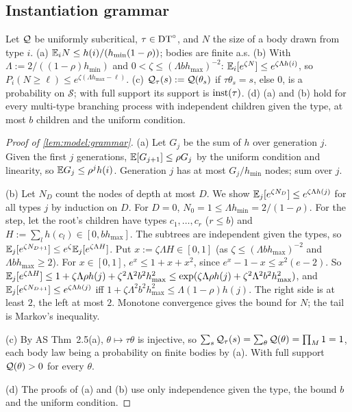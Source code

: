 \subsection{Instantiation grammar}\label{app:model:grammar}

\begin{lemma}\label{lem:model:grammar}
Let $\mathcal{Q}$ be uniformly subcritical, $\tau\in\mathrm{DT}^{\circ}$, and $N$ the size of a body drawn from type $i$.
(a) $\mathbb{E}_iN\le h(i)/(h_{\min}(1-\rho))$; bodies are finite a.s.
(b) With $\Lambda:=2/((1-\rho)h_{\min})$ and $0<\zeta\le(\Lambda bh_{\max})^{-2}$: $\mathbb{E}_i[e^{\zeta N}]\le e^{\zeta\Lambda h(i)}$, so $P_i(N\ge\ell)\le e^{\zeta(\Lambda h_{\max}-\ell)}$.
(c) $\mathcal{Q}_\tau(s):=\mathcal{Q}(\theta_s)$ if $\tau\theta_s=s$, else $0$, is a probability on $\mathcal S$; with full support its support is $\mathrm{inst}(\tau)$.
(d) (a) and (b) hold for every multi-type branching process with independent children given the type, at most $b$ children and the uniform condition.
\end{lemma}

\begin{proof}[Proof of \cref{lem:model:grammar}]
(a) Let $G_j$ be the sum of $h$ over generation $j$. Given the first $j$ generations, $\mathbb{E}[G_{j+1}]\le\rho G_j$ by the uniform condition and linearity, so $\mathbb{E} G_j\le\rho^jh(i)$. Generation $j$ has at most $G_j/h_{\min}$ nodes; sum over $j$.

(b) Let $N_D$ count the nodes of depth at most $D$. We show $\mathbb{E}_j[e^{\zeta N_D}]\le e^{\zeta\Lambda h(j)}$ for all types $j$ by induction on $D$. For $D=0$, $N_0=1\le\Lambda h_{\min}=2/(1-\rho)$. For the step, let the root's children have types $c_1,\dots,c_r$ ($r\le b$) and $H:=\sum_lh(c_l)\in[0,bh_{\max}]$. The subtrees are independent given the types, so $\mathbb{E}_j[e^{\zeta N_{D+1}}]\le e^\zeta\mathbb{E}_j[e^{\zeta\Lambda H}]$. Put $x:=\zeta\Lambda H\in[0,1]$ (as $\zeta\le(\Lambda bh_{\max})^{-2}$ and $\Lambda bh_{\max}\ge2$). For $x\in[0,1]$, $e^x\le1+x+x^2$, since $e^x-1-x\le x^2(e-2)$. So $\mathbb{E}_j[e^{\zeta\Lambda H}]\le1+\zeta\Lambda\rho h(j)+\zeta^2\Lambda^2b^2h_{\max}^2\le\exp(\zeta\Lambda\rho h(j)+\zeta^2\Lambda^2b^2h_{\max}^2)$, and $\mathbb{E}_j[e^{\zeta N_{D+1}}]\le e^{\zeta\Lambda h(j)}$ iff $1+\zeta\Lambda^2b^2h_{\max}^2\le\Lambda(1-\rho)h(j)$. The right side is at least $2$, the left at most $2$. Monotone convergence gives the bound for $N$; the tail is Markov's inequality.

(c) By AS Thm~2.5(a), $\theta\mapsto\tau\theta$ is injective, so $\sum_s\mathcal{Q}_\tau(s)=\sum_\theta\mathcal{Q}(\theta)=\prod_M1=1$, each body law being a probability on finite bodies by (a). With full support $\mathcal{Q}(\theta)>0$ for every $\theta$.

(d) The proofs of (a) and (b) use only independence given the type, the bound $b$ and the uniform condition.
\end{proof}

